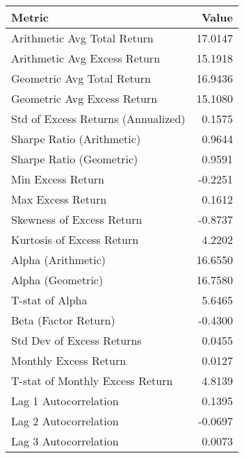 \begin{tabular}{lr}
\toprule
Metric & Value \\
\midrule
Arithmetic Avg Total Return & 17.0147 \\
Arithmetic Avg Excess Return & 15.1918 \\
Geometric Avg Total Return & 16.9436 \\
Geometric Avg Excess Return & 15.1080 \\
Std of Excess Returns (Annualized) & 0.1575 \\
Sharpe Ratio (Arithmetic) & 0.9644 \\
Sharpe Ratio (Geometric) & 0.9591 \\
Min Excess Return & -0.2251 \\
Max Excess Return & 0.1612 \\
Skewness of Excess Return & -0.8737 \\
Kurtosis of Excess Return & 4.2202 \\
Alpha (Arithmetic) & 16.6550 \\
Alpha (Geometric) & 16.7580 \\
T-stat of Alpha & 5.6465 \\
Beta (Factor Return) & -0.4300 \\
Std Dev of Excess Returns & 0.0455 \\
Monthly Excess Return & 0.0127 \\
T-stat of Monthly Excess Return & 4.8139 \\
Lag 1 Autocorrelation & 0.1395 \\
Lag 2 Autocorrelation & -0.0697 \\
Lag 3 Autocorrelation & 0.0073 \\
\bottomrule
\end{tabular}
